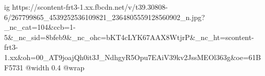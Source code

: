  
 
 
 
 

\ifcmt
  ig https://scontent-frt3-1.xx.fbcdn.net/v/t39.30808-6/267799865_4539252536109821_2364805559128560902_n.jpg?_nc_cat=104&ccb=1-5&_nc_sid=8bfeb9&_nc_ohc=bKT4cLYK67AAX8WtjrP&_nc_ht=scontent-frt3-1.xx&oh=00_AT9joajQh0it3J_NdhgyR5Opu7EAiV39kv2JssMEOl363g&oe=61BF5731
  @width 0.4
  @wrap 
\fi
